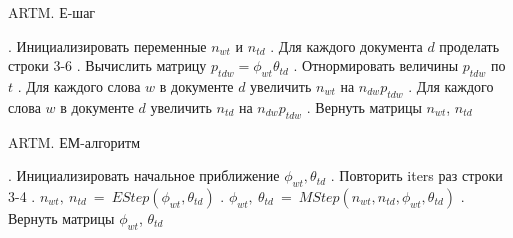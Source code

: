 \documentclass[12pt]{article}
\newenvironment{rusalgorithm}[1][htb]
  {\renewcommand{\algorithmcfname}{Алгоритм}
   \begin{algorithm}[#1]
  }{\end{algorithm}}
\begin{document}
\begin{rusalgorithm}[H]
\caption{ARTM. Е-шаг}\label{malgo4}
\begin{algorithmic}[]
. Инициализировать переменные $n_{wt}$ и $n_{td}$
. Для каждого документа $d$ проделать строки 3-6
. Вычислить матрицу $p_{tdw} = \phi_{wt} \theta_{td}$
. Отнормировать величины $p_{tdw}$ по $t$
. Для каждого слова $w$ в документе $d$ увеличить $n_{wt}$ на $n_{dw}p_{tdw}$
. Для каждого слова $w$ в документе $d$ увеличить $n_{td}$ на $n_{dw}p_{tdw}$
. Вернуть матрицы $n_{wt}$, $n_{td}$
\EndProcedure
\end{algorithmic}
\end{rusalgorithm}

\begin{rusalgorithm}[H]
\caption{ARTM. ЕМ-алгоритм}\label{malgo5}
\begin{algorithmic}[]
. Инициализировать начальное приближение $\phi_{wt}, \theta_{td}$
. Повторить iters раз строки 3-4
. $n_{wt},~n_{td}~=~EStep(\phi_{wt}, \theta_{td})$
. $\phi_{wt},~\theta_{td}~=~MStep(n_{wt},n_{td},\phi_{wt}, \theta_{td})$
. Вернуть матрицы $\phi_{wt}$, $\theta_{td}$
\EndProcedure
\end{algorithmic}
\end{rusalgorithm}
\end{document}
